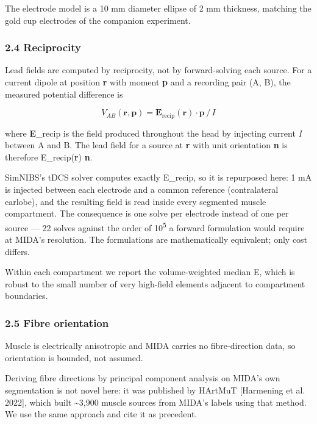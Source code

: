 \documentclass[
  11pt,
  letterpaper,
]{article}
\begin{document}
The electrode model is a 10 mm diameter ellipse of 2 mm thickness, matching the
gold cup electrodes of the companion experiment.

\subsubsection{2.4 Reciprocity}\label{reciprocity}

Lead fields are computed by reciprocity, not by forward-solving each source. For
a current dipole at position \textbf{r} with moment \textbf{p} and a recording pair (A,
B), the measured potential difference is

\[V_{AB}(\mathbf{r}, \mathbf{p}) = \mathbf{E}_{\mathrm{recip}}(\mathbf{r}) \cdot \mathbf{p} \, / \, I\]

where \textbf{E}\_recip is the field produced throughout the head by injecting current
\emph{I} between A and B. The lead field for a source at \textbf{r} with unit orientation
\textbf{n} is therefore E\_recip(\textbf{r}) \textperiodcentered{} \textbf{n}.

SimNIBS's tDCS solver computes exactly E\_recip, so it is repurposed here: 1 mA
is injected between each electrode and a common reference (contralateral
earlobe), and the resulting field is read inside every segmented muscle
compartment. The consequence is one solve per electrode instead of one per
source --- 22 solves against the order of 10\textsuperscript{5} a forward formulation would require
at MIDA's resolution. The formulations are mathematically equivalent; only cost
differs.

Within each compartment we report the volume-weighted median \textbar E\textbar, which is
robust to the small number of very high-field elements adjacent to compartment
boundaries.

\subsubsection{2.5 Fibre orientation}\label{fibre-orientation}

Muscle is electrically anisotropic and MIDA carries no fibre-direction data, so
orientation is bounded, not assumed.

Deriving fibre directions by principal component analysis on MIDA's own
segmentation is not novel here: it was published by HArtMuT {[}Harmening et al.
2022{]}, which built \textasciitilde3,900 muscle sources from MIDA's labels using that method.
We use the same approach and cite it as precedent.
\end{document}
